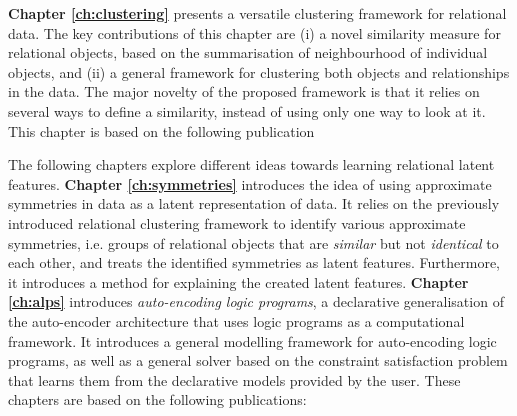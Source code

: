 \textbf{Chapter \ref{ch:clustering}} presents a versatile clustering framework for relational data.
The key contributions of this chapter are (i) a novel similarity measure for relational objects, based on the summarisation of neighbourhood of individual objects, and (ii) a general framework for clustering both objects and relationships in the data.
The major novelty of the proposed framework is that it relies on several ways to define a similarity, instead of using only one way to look at it.
This chapter is based on the following publication

\begin{quote}
\end{quote}





The following chapters explore different ideas towards learning relational latent features.
\textbf{Chapter \ref{ch:symmetries}} introduces the idea of using approximate symmetries in data as a latent representation of data.
It relies on the previously introduced relational clustering framework to identify various approximate symmetries, i.e. groups of relational objects that are \textit{similar} but not \textit{identical} to each other, and treats the identified symmetries as latent features.
Furthermore, it introduces a method for explaining the created latent features.
\textbf{Chapter \ref{ch:alps}} introduces \textit{auto-encoding logic programs}, a declarative generalisation of the auto-encoder architecture \cite{Hinton504} that uses logic programs as a computational framework.
It introduces a general modelling framework for auto-encoding logic programs, as well as a general solver based on the constraint satisfaction problem that learns them from the declarative models provided by the user.
These chapters are based on the following publications:

\begin{quote}
\end{quote}

\begin{quote}
\end{quote}

\begin{quote}
\end{quote}

\begin{quote}
\end{quote}

